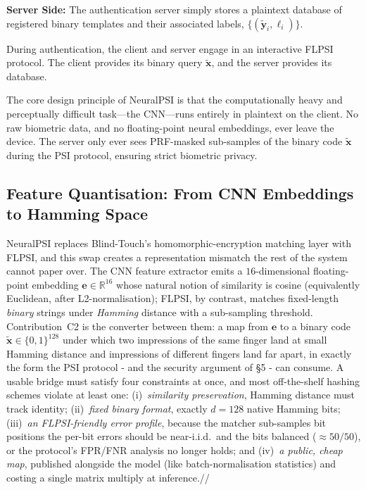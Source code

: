 \documentclass[11pt,a4paper]{article}
\begin{document}
\textbf{Server Side:} The authentication server simply stores a plaintext database of registered binary templates and their associated labels, $\{(\tilde{\mathbf{y}}_i, \ell_i)\}$. 

During authentication, the client and server engage in an interactive FLPSI protocol. The client provides its binary query $\tilde{\mathbf{x}}$, and the server provides its database. 

The core design principle of NeuralPSI is that the computationally heavy and perceptually difficult task---the CNN---runs entirely in plaintext on the client. No raw biometric data, and no floating-point neural embeddings, ever leave the device. The server only ever sees PRF-masked sub-samples of the binary code $\tilde{\mathbf{x}}$ during the PSI protocol, ensuring strict biometric privacy.

\subsection{Feature Quantisation: From CNN Embeddings to Hamming Space}

NeuralPSI replaces Blind-Touch's homomorphic-encryption matching layer with FLPSI,
and this swap creates a representation mismatch the rest of the system cannot paper
over. The CNN feature extractor emits a $16$-dimensional floating-point embedding
$\mathbf{e}\in\mathbb{R}^{16}$ whose natural notion of similarity is cosine
(equivalently Euclidean, after L2-normalisation); FLPSI, by contrast, matches
fixed-length \emph{binary} strings under \emph{Hamming} distance with a sub-sampling
threshold. Contribution~C2 is the converter between them: a map from $\mathbf{e}$ to a
binary code $\tilde{\mathbf{x}}\in\{0,1\}^{128}$ under which two impressions of the
same finger land at small Hamming distance and impressions of different fingers land
far apart, in exactly the form the PSI protocol - and the security argument of
\S5 - can consume. A usable bridge must satisfy four constraints at once, and most
off-the-shelf hashing schemes violate at least one:
(i)~\emph{similarity preservation}, Hamming distance must track identity;
(ii)~\emph{fixed binary format}, exactly $d=128$ native Hamming bits;
(iii)~\emph{an FLPSI-friendly error profile}, because the matcher sub-samples bit
positions the per-bit errors should be near-i.i.d.\ and the bits balanced
($\approx 50/50$), or the protocol's FPR/FNR analysis no longer holds; and
(iv)~\emph{a public, cheap map}, published alongside the model (like
batch-normalisation statistics) and costing a single matrix multiply at inference.//
\end{document}
